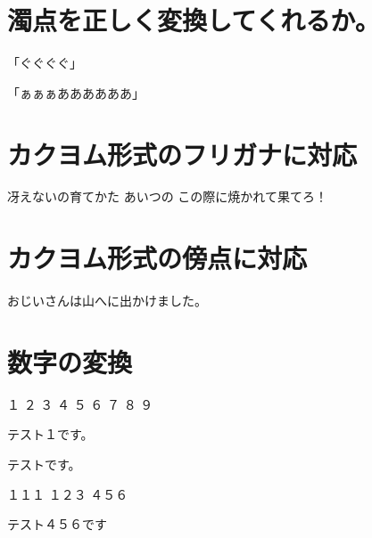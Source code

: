 \hypertarget{ux6fc1ux70b9ux3092ux6b63ux3057ux304fux5909ux63dbux3057ux3066ux304fux308cux308bux304b}{%
\section{濁点を正しく変換してくれるか。}\label{ux6fc1ux70b9ux3092ux6b63ux3057ux304fux5909ux63dbux3057ux3066ux304fux308cux308bux304b}}

「ぐぐぐぐ」

「ぁぁぁああああああ」

\hypertarget{ux30abux30afux30e8ux30e0ux5f62ux5f0fux306eux30d5ux30eaux30acux30caux306bux5bfeux5fdc}{%
\section{カクヨム形式のフリガナに対応}\label{ux30abux30afux30e8ux30e0ux5f62ux5f0fux306eux30d5ux30eaux30acux30caux306bux5bfeux5fdc}}

冴えないの育てかた
あいつの
この際に焼かれて果てろ！

\hypertarget{ux30abux30afux30e8ux30e0ux5f62ux5f0fux306eux508dux70b9ux306bux5bfeux5fdc}{%
\section{カクヨム形式の傍点に対応}\label{ux30abux30afux30e8ux30e0ux5f62ux5f0fux306eux508dux70b9ux306bux5bfeux5fdc}}

おじいさんは山へに出かけました。

\hypertarget{ux6570ux5b57ux306eux5909ux63db}{%
\section{数字の変換}\label{ux6570ux5b57ux306eux5909ux63db}}

１ ２ ３ ４ ５ ６ ７ ８ ９

テスト１です。

{\small{}} {\small{}}
{\small{}}

テスト{\small{}}です。

１１１ １２３ ４５６

テスト４５６です
